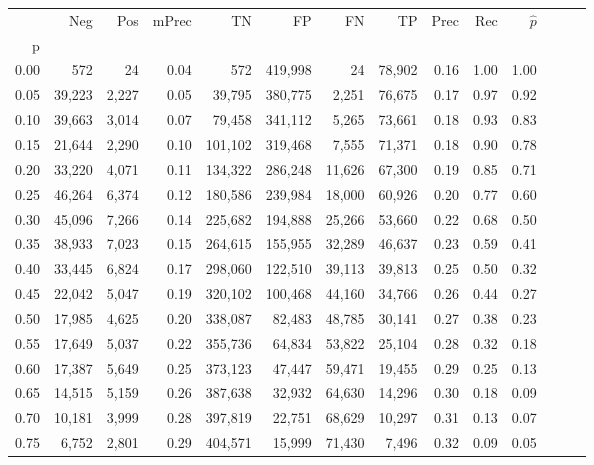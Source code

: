 \begin{tabular}{rrrrrrrrrrrrrr}
\toprule
{} &     Neg &    Pos & mPrec &       TN &       FP &      FN &      TP &  Prec &   Rec & $\hat{p}$ \\
p    &         &        &       &          &          &         &         &       &       &           \\
\midrule
0.00 &     572 &     24 &  0.04 &      572 &  419,998 &      24 &  78,902 &  0.16 &  1.00 &      1.00 \\
0.05 &  39,223 &  2,227 &  0.05 &   39,795 &  380,775 &   2,251 &  76,675 &  0.17 &  0.97 &      0.92 \\
0.10 &  39,663 &  3,014 &  0.07 &   79,458 &  341,112 &   5,265 &  73,661 &  0.18 &  0.93 &      0.83 \\
0.15 &  21,644 &  2,290 &  0.10 &  101,102 &  319,468 &   7,555 &  71,371 &  0.18 &  0.90 &      0.78 \\
0.20 &  33,220 &  4,071 &  0.11 &  134,322 &  286,248 &  11,626 &  67,300 &  0.19 &  0.85 &      0.71 \\
0.25 &  46,264 &  6,374 &  0.12 &  180,586 &  239,984 &  18,000 &  60,926 &  0.20 &  0.77 &      0.60 \\
0.30 &  45,096 &  7,266 &  0.14 &  225,682 &  194,888 &  25,266 &  53,660 &  0.22 &  0.68 &      0.50 \\
0.35 &  38,933 &  7,023 &  0.15 &  264,615 &  155,955 &  32,289 &  46,637 &  0.23 &  0.59 &      0.41 \\
0.40 &  33,445 &  6,824 &  0.17 &  298,060 &  122,510 &  39,113 &  39,813 &  0.25 &  0.50 &      0.32 \\
0.45 &  22,042 &  5,047 &  0.19 &  320,102 &  100,468 &  44,160 &  34,766 &  0.26 &  0.44 &      0.27 \\
0.50 &  17,985 &  4,625 &  0.20 &  338,087 &   82,483 &  48,785 &  30,141 &  0.27 &  0.38 &      0.23 \\
0.55 &  17,649 &  5,037 &  0.22 &  355,736 &   64,834 &  53,822 &  25,104 &  0.28 &  0.32 &      0.18 \\
0.60 &  17,387 &  5,649 &  0.25 &  373,123 &   47,447 &  59,471 &  19,455 &  0.29 &  0.25 &      0.13 \\
0.65 &  14,515 &  5,159 &  0.26 &  387,638 &   32,932 &  64,630 &  14,296 &  0.30 &  0.18 &      0.09 \\
0.70 &  10,181 &  3,999 &  0.28 &  397,819 &   22,751 &  68,629 &  10,297 &  0.31 &  0.13 &      0.07 \\
0.75 &   6,752 &  2,801 &  0.29 &  404,571 &   15,999 &  71,430 &   7,496 &  0.32 &  0.09 &      0.05 \\

\end{tabular}
